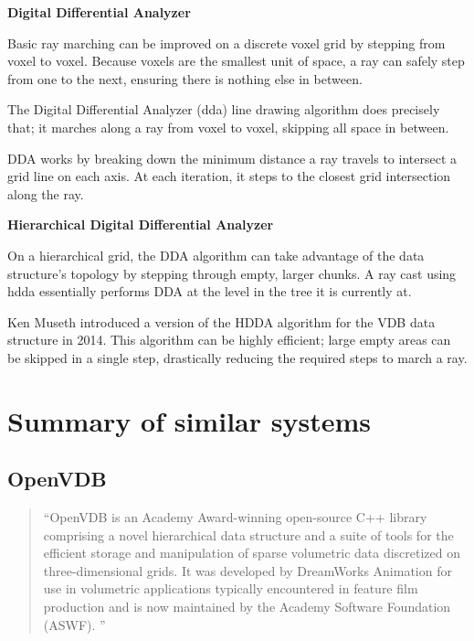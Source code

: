 \vspace{0.5cm}
\label{def:dda}
\textbf{Digital Differential Analyzer}

Basic ray marching can be improved on a discrete voxel grid by stepping from voxel to voxel. Because voxels are the smallest unit of space, a ray can safely step from one to the next, ensuring there is nothing else in between.

The Digital Differential Analyzer (\acrshort{dda}) line drawing algorithm does precisely that; it marches along a ray from voxel to voxel, skipping all space in between.

DDA works by breaking down the minimum distance a ray travels to intersect a grid line on each axis.
At each iteration, it steps to the closest grid intersection along the ray.

\vspace{0.5cm}
\label{def:hdda}
\textbf{Hierarchical  Digital Differential Analyzer}

On a hierarchical grid, the DDA algorithm can take advantage of the data structure's topology by stepping through empty, larger chunks.
A ray cast using \acrshort{hdda} essentially performs DDA at the level in the tree it is currently at.

Ken Museth introduced a version of the HDDA algorithm for the VDB data structure in 2014\supercite{vdb2014}.
This algorithm can be highly efficient; large empty areas can be skipped in a single step, drastically reducing the required steps to march a ray.

\section{Summary of similar systems}
\subsection{OpenVDB\supercite{openvdb:doc}}

\begin{quote}
``OpenVDB is an Academy Award-winning open-source C++ library comprising a novel hierarchical data structure and a suite of tools for the efficient storage and manipulation of sparse volumetric data discretized on three-dimensional grids. It was developed by DreamWorks Animation for use in volumetric applications typically encountered in feature film production and is now maintained by the Academy Software Foundation (ASWF).
''
\end{quote}

